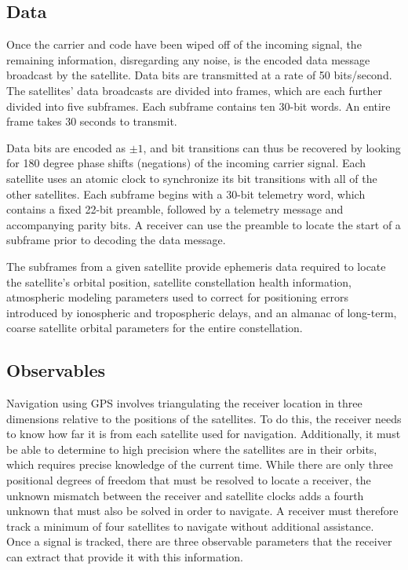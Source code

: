 \documentclass[12pt]{article}
\begin{document}
\subsection{Data}
\label{sec:data}
Once the carrier and code have been wiped off of the incoming signal, the remaining information, disregarding any noise, is the encoded data message broadcast by the satellite. Data bits are transmitted at a rate of 50 bits/second. The satellites' data broadcasts are divided into frames, which are each further divided into five subframes. Each subframe contains ten 30-bit words. An entire frame takes 30 seconds to transmit.

Data bits are encoded as $\pm 1$, and bit transitions can thus be recovered by looking for 180 degree phase shifts (negations) of the incoming carrier signal. Each satellite uses an atomic clock to synchronize its bit transitions with all of the other satellites. Each subframe begins with a 30-bit telemetry word, which contains a fixed 22-bit preamble, followed by a telemetry message and accompanying parity bits. \cite{navstar} A receiver can use the preamble to locate the start of a subframe prior to decoding the data message.

The subframes from a given satellite provide ephemeris data required to locate the satellite's orbital position, satellite constellation health information, atmospheric modeling parameters used to correct for positioning errors introduced by ionospheric and tropospheric delays, and an almanac of long-term, coarse satellite orbital parameters for the entire constellation.

\subsection{Observables}
\label{sec:observables}
Navigation using GPS involves triangulating the receiver location in three dimensions relative to the positions of the satellites. To do this, the receiver needs to know how far it is from each satellite used for navigation. Additionally, it must be able to determine to high precision where the satellites are in their orbits, which requires precise knowledge of the current time. While there are only three positional degrees of freedom that must be resolved to locate a receiver, the unknown mismatch between the receiver and satellite clocks adds a fourth unknown that must also be solved in order to navigate. A receiver must therefore track a minimum of four satellites to navigate without additional assistance. Once a signal is tracked, there are three observable parameters that the receiver can extract that provide it with this information.
\end{document}

